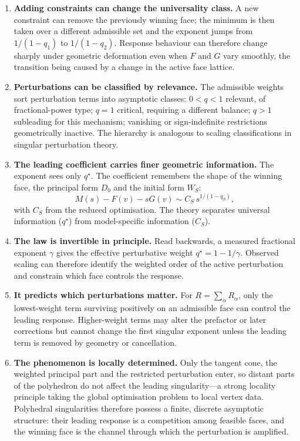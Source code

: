 \documentclass[11pt]{article}
\theoremstyle{definition}
\theoremstyle{remark}
\begin{document}
\begin{enumerate}[wide=0pt]
\item \textbf{Adding constraints can change the universality class.}
A new constraint can remove the previously winning face; the minimum is then
taken over a different admissible set and the exponent jumps from
$1/(1-q_1)$ to $1/(1-q_2)$. Response behaviour can therefore change sharply
under geometric deformation even when $F$ and $G$ vary smoothly, the
transition being caused by a change in the active face lattice.

\item \textbf{Perturbations can be classified by relevance.}\label{imp:classes}
The admissible weights sort perturbation terms into asymptotic classes:
$0<q<1$ relevant, of fractional-power type; $q=1$ critical, requiring a
different balance; $q>1$ subleading for this mechanism; vanishing or
sign-indefinite restrictions geometrically inactive. The hierarchy is
analogous to scaling classifications in singular perturbation theory.

\item \textbf{The leading coefficient carries finer geometric information.}
The exponent sees only $q^\star$. The coefficient remembers the shape of the
winning face, the principal form $D_0$ and the initial form $W_S$:
\[
  M(s)-F(v)-sG(v)\sim C_S\,s^{1/(1-q_S)},
\]
with $C_S$ from the reduced optimisation. The theory separates universal
information ($q^\star$) from model-specific information ($C_S$).

\item \textbf{The law is invertible in principle.}
Read backwards, a measured fractional exponent $\gamma$ gives the effective
perturbative weight $q^\star=1-1/\gamma$. Observed scaling can therefore
identify the weighted order of the active perturbation and constrain which
face controls the response.

\item \textbf{It predicts which perturbations matter.}
For $R=\sum_\alpha R_\alpha$, only the lowest-weight term surviving positively
on an admissible face can control the leading response. Higher-weight terms
may alter the prefactor or later corrections but cannot change the first
singular exponent unless the leading term is removed by geometry or
cancellation.

\item \textbf{The phenomenon is locally determined.}
Only the tangent cone, the weighted principal part and the restricted
perturbation enter, so distant parts of the polyhedron do not affect the
leading singularity---a strong locality principle taking the global
optimisation problem to local vertex data. Polyhedral singularities therefore
possess a finite, discrete asymptotic structure: their leading response is a
competition among feasible faces, and the winning face is the channel through
which the perturbation is amplified.

\end{enumerate}
\end{document}
